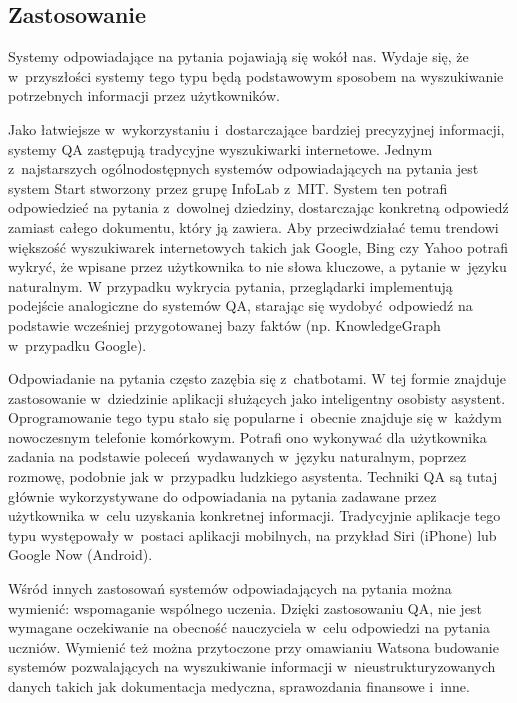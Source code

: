 \documentclass[a4paper, twoside, 12pt]{report}
\begin{document}
        \subsection{Zastosowanie}
            Systemy odpowiadające na pytania pojawiają się wokół nas. Wydaje się, że w~przyszłości systemy tego typu będą
            podstawowym sposobem na wyszukiwanie potrzebnych informacji przez użytkowników.

            Jako łatwiejsze w~wykorzystaniu i~dostarczające bardziej precyzyjnej informacji, systemy QA zastępują tradycyjne
            wyszukiwarki internetowe. Jednym z~najstarszych ogólnodostępnych systemów odpowiadających na pytania jest
            system Start stworzony przez grupę InfoLab z~MIT. System ten potrafi odpowiedzieć na pytania z~dowolnej
            dziedziny, dostarczając konkretną odpowiedź zamiast całego dokumentu, który ją zawiera.
            Aby przeciwdziałać temu trendowi  większość wyszukiwarek internetowych takich jak Google, Bing czy Yahoo
            potrafi wykryć, że wpisane przez użytkownika to nie słowa kluczowe, a pytanie w~języku naturalnym.
            W przypadku wykrycia pytania, przeglądarki implementują podejście analogiczne do systemów QA, starając się
            wydobyć odpowiedź na podstawie wcześniej przygotowanej bazy faktów (np. KnowledgeGraph w~przypadku Google).

            Odpowiadanie na pytania często zazębia się z~chatbotami. W tej formie znajduje zastosowanie w~dziedzinie
            aplikacji służących jako inteligentny
            osobisty asystent. Oprogramowanie tego typu stało się popularne i~obecnie znajduje się w~każdym nowoczesnym
            telefonie komórkowym. Potrafi ono wykonywać dla użytkownika zadania na podstawie poleceń wydawanych w~języku
            naturalnym, poprzez rozmowę, podobnie jak w~przypadku ludzkiego asystenta. Techniki QA są tutaj głównie
            wykorzystywane do odpowiadania na pytania zadawane przez użytkownika w~celu uzyskania konkretnej informacji.
            Tradycyjnie aplikacje tego typu występowały w~postaci aplikacji mobilnych, na przykład Siri (iPhone) lub
            Google Now (Android).

            Wśród innych zastosowań systemów odpowiadających na pytania można wymienić: wspomaganie wspólnego
            uczenia\cite{COLLABORATIVELEARNING}. Dzięki zastosowaniu QA, nie jest wymagane oczekiwanie na obecność nauczyciela
            w~celu odpowiedzi na pytania uczniów. Wymienić też można przytoczone przy omawianiu Watsona budowanie systemów
            pozwalających na wyszukiwanie informacji w~nieustrukturyzowanych danych takich jak dokumentacja medyczna,
            sprawozdania finansowe i~inne.
\end{document}
